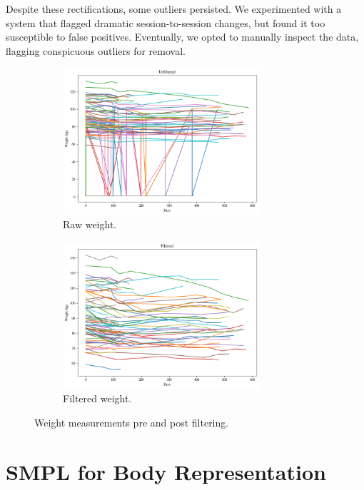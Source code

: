 Despite these rectifications, some outliers persisted. We experimented with a
system that flagged dramatic session-to-session changes, but found it too
susceptible to false positives. Eventually, we opted to manually inspect the
data, flagging conspicuous outliers for removal.

\begin{figure}[h]
	\centering
	\begin{subfigure}{\textwidth}
		\centering
		\includegraphics[width=0.8\textwidth]{files/weight_unfiltered}
		\caption{Raw weight.}
	\end{subfigure}
	\begin{subfigure}{\textwidth}
		\centering
		\includegraphics[width=0.8\textwidth]{files/weight_filtered}
		\caption{Filtered weight.}
	\end{subfigure}
	\caption{Weight measurements pre and post filtering.}
\end{figure}

\section{SMPL for Body Representation}

